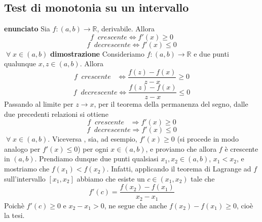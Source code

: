 \documentclass[a4paper, 9pt]{report}
\begin{document}
\subsection*{Test di monotonia su un intervallo}
\textbf{enunciato}\newline
Sia $f:(a,b) \rightarrow \mathbb{R}$, derivabile. Allora
\[
    f \;\; crescente \Longleftrightarrow f'(x)\geq 0
\]
\[
    f \;\; decrescente \Longleftrightarrow  f'(x) \leq 0
\]
$\;\forall\; x \in (a,b)$\newline 
\newline
\textbf{dimostrazione}\newline 
Consideriamo $f: (a,b) \rightarrow \mathbb{R}$ e due punti qualunque $x,z \in (a,b)$. Allora
\[
    f \;\; crescente \;\;\; \Longleftrightarrow \frac{f(z) - f(x)}{z-x} \geq 0
\]
\[
    f \;\; decrescente \Longleftrightarrow \frac{f(z) - f(x)}{z-x} \leq 0
\]
Passando al limite per $z \rightarrow x$, per il teorema della permanenza del segno, dalle due precedenti relazioni si ottiene 
\[
    f \;\; crescente \;\;\; \Rightarrow f'(x) \geq 0
\]
\[
    f \;\; decrescente \Rightarrow  f'(x) \leq 0
\]
$\;\forall\; x \in (a,b)$.\newline
Viceversa , sia, ad esempio, $f'(x) \geq 0$ (si procede in modo analogo per $f'(x) \leq 0$) per ogni $x \in (a,b)$, e proviamo che allora $f$ è crescente in $(a,b)$. Prendiamo dunque due punti qualsiasi $x_1, x_2 \in (a,b)$, $x_1 < x_2$, e mostriamo che $f(x_1) < f(x_2)$. Infatti, applicando il teorema di Lagrange ad $f$ sull'intervallo $[x_1, x_2]$ abbiamo che esiste un $c \in (x_1, x_2)$ tale che
\[
    f'(c) = \frac{f(x_2) - f(x_1)}{x_2 - x_1}
\]
Poichè $f'(c) \geq 0$ e $x_2 - x_1 > 0$, ne segue che anche $f(x_2) - f(x_1) \geq 0$, cioè la tesi.\newline





\newpage
\end{document}
